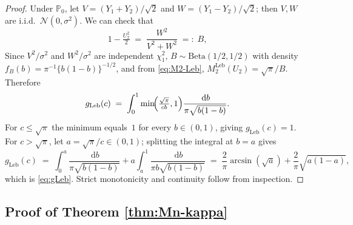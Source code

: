 \documentclass[numsec,webpdf,modern,medium,namedate]{oup-authoring-template}
\theoremstyle{thmstyleone}%
\theoremstyle{thmstyletwo}%
\theoremstyle{thmstylethree}%
\newcommand{\Prob}{\mathbb{P}}
\newcommand{\dd}{\,\mathrm{d}}
\newcommand{\Leb}{\mathrm{Leb}}
\newcommand{\1}{\mathbf{1}}
\begin{document}
\begin{appendices}
\begin{proof}
    Under \(\Prob_0\), let \(V=(Y_1+Y_2)/\sqrt 2\) and
\(W=(Y_1-Y_2)/\sqrt 2\); then \(V,W\) are i.i.d.\
\(\mathcal N(0,\sigma^2)\). We can check that
\[
   1-\tfrac{U_2^2}{2}\;=\;\frac{W^2}{V^2+W^2}\;=:\;B,
\]
Since $V^2/\sigma^2$ and $W^2/\sigma^2$ are independent $\chi_1^2$, \(B\sim\mathrm{Beta}(1/2,1/2)\) with density
\(f_B(b)=\pi^{-1}\{b(1-b)\}^{-1/2}\), and from \eqref{eq:M2-Leb},
\(M_2^{\Leb}(U_2)=\sqrt\pi/B\). Therefore
\[
  g_{\Leb}(c)
  \;=\;\int_0^1\min\!\Bigl(\tfrac{\sqrt\pi}{cb},1\Bigr)
       \frac{\dd b}{\pi\sqrt{b(1-b)}}.
\]
For \(c\leq\sqrt\pi\) the minimum equals~\(1\) for every
\(b\in(0,1)\), giving \(g_{\Leb}(c)=1\). For \(c>\sqrt\pi\), let
\(a=\sqrt\pi/c\in(0,1)\); splitting the integral at \(b=a\) gives
\[
  g_{\Leb}(c)\;=\;
  \int_0^a\frac{\dd b}{\pi\sqrt{b(1-b)}}
  +a\int_a^1\frac{\dd b}{\pi b\sqrt{b(1-b)}}
  \;=\;\frac{2}{\pi}\arcsin(\sqrt a)+\frac{2}{\pi}\sqrt{a(1-a)},
\]
which is \eqref{eq:gLeb}. Strict monotonicity and continuity follow
from inspection.
\end{proof}

\subsection{Proof of Theorem \ref{thm:Mn-kappa}}\label{app:proofs-closedform}




\end{appendices}
\end{document}
